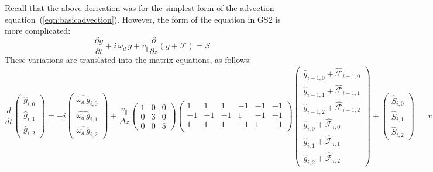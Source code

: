 \documentclass[10pt,a4paper]{article}
\newcommand{\dd}{\partial}
\begin{document}
Recall that the above derivation was for the simplest form of the advection
equation~(\ref{eqn:basicadvection}). However, the form of the equation in GS2
is more complicated:
\begin{equation}
  \frac{\dd g}{\dd t} + i \, \omega_d \, g + v_\parallel \frac{\dd}{\dd z} (g+\mathcal{F})
  = S
\label{eqn:gs2form4dg}
\end{equation}
These variations are translated into the matrix equations, as follows: \footnotesize
\begin{equation} \boxed{
\frac{d}{dt} \left( \begin{array}{c}
\hat{g}_{i,0} \\ \hat{g}_{i,1} \\ \hat{g}_{i,2}
\end{array} \right)
=
-i \left( \begin{array}{c}
\widehat{\omega_d\,g}_{i,0} \\ \widehat{\omega_d\,g}_{i,1} \\ \widehat{\omega_d\,g}_{i,2}
\end{array} \right)
+ \frac{v_\parallel}{\Delta z} \left(
\begin{array}{ccc}
1 & 0 & 0 \\
0 & 3 & 0 \\
0 & 0 & 5
\end{array} \right)
\left(
\begin{array}{rrrrrr}
1 & 1 & 1 & -1 & -1 & -1 \\
-1 & -1 & -1 & 1 & -1 & -1 \\
1 & 1 & 1 & -1 & 1 & -1 \\
\end{array} \right)
\left( \begin{array}{c}
\hat{g}_{i-1,0} + \hat{\mathcal{F}}_{i-1,0} \\
\hat{g}_{i-1,1} + \hat{\mathcal{F}}_{i-1,1} \\
\hat{g}_{i-1,2} + \hat{\mathcal{F}}_{i-1,2} \\
\hat{g}_{i,0} + \hat{\mathcal{F}}_{i,0} \\
\hat{g}_{i,1} + \hat{\mathcal{F}}_{i,1} \\
\hat{g}_{i,2} + \hat{\mathcal{F}}_{i,2}
\end{array} \right)
+ \left( \begin{array}{c}
\hat{S}_{i,0} \\ \hat{S}_{i,1} \\ \hat{S}_{i,2}
\end{array} \right)
} \;\;\;\;\;\; v_\parallel \geq 0
\label{eqn:vplus}
\end{equation}
\end{document}
